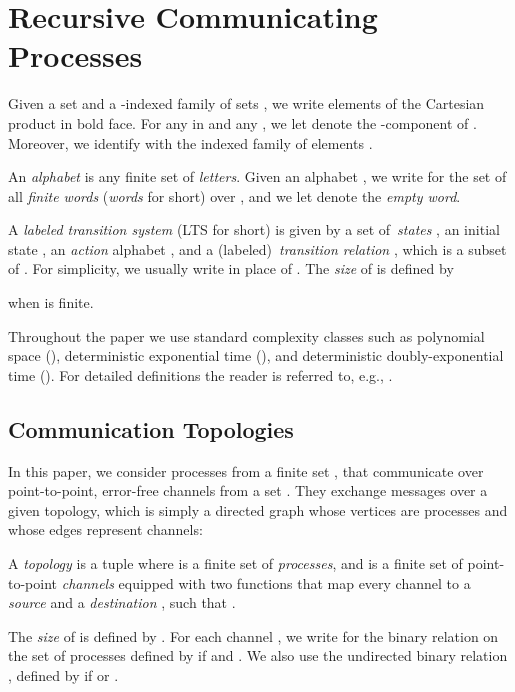 \documentclass{LMCS}
\newenvironment{definition}{\begin{defi}}{\end{defi}}
\begin{document}
 
\section{Recursive Communicating Processes}




Given a set  and a -indexed family of sets , we 
write elements of the Cartesian product  in bold face.  For
any  in  and any , we let 
denote the -component of  .  Moreover, we identify 
with the indexed family of elements .

An \emph{alphabet} is any finite set of \emph{letters}.  Given an
alphabet , we write  for the set of all \emph{finite words}
(\emph{words} for short) over , and we let  denote the
\emph{empty word}.  


A \emph{labeled transition system} (LTS for short)
 is given by a set
of~\emph{states} , an initial state , an 
\emph{action} alphabet , and a (labeled)~\emph{transition relation}
, which is a subset of . For
simplicity, we usually write  in place of . The \emph{size} of  is defined by

when  is finite.


Throughout the paper we use standard complexity classes such as
polynomial space (\pspace), deterministic exponential time (\dexptime), and
deterministic doubly-exponential time (\twodexptime).  For detailed definitions
the reader is referred to, e.g., \cite{papadimitriou-c-1994--a}.





\subsection{Communication Topologies}

In this paper, we consider processes from a finite set , that
communicate over point-to-point, error-free \fifo channels from a set
. They exchange messages over a given  topology, which
is simply a directed graph whose vertices are processes and whose
edges represent channels:

\begin{definition}
  A \emph{topology}   is a tuple  where 
  is a finite set of \emph{processes}, and  is a finite set
  of point-to-point \emph{channels} equipped with two functions
   that map every channel  to a
  \emph{source}  and a \emph{destination}
  , such that .
\end{definition}

The \emph{size} of  is defined by .
For each channel , we write  for the binary
relation on the set of processes  defined by 
if  and . We also use the undirected
binary relation , defined by  if
 or .
\end{document}
